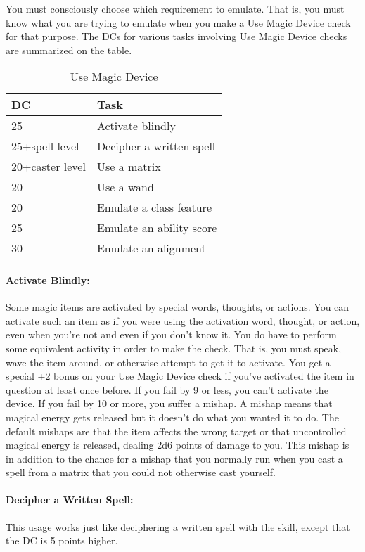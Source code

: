 You must consciously choose which requirement to emulate. That is, you must know what you are trying to emulate when you make a Use Magic Device check for that purpose. The DCs for various tasks involving Use Magic Device checks are summarized on the  table.
\begin{table*}
\centering
\caption{Use Magic Device}
\small
\label{tab:UseMagicDevice}
\begin{tabular}{ll}
\toprule
\textbf{DC}&\textbf{Task}\\
\midrule
25&Activate blindly\\
25+spell level&Decipher a written spell\\
20+caster level&Use a matrix\\
20&Use a wand\\
20&Emulate a class feature\\
25&Emulate an ability score\\
30&Emulate an alignment\\
\bottomrule
\end{tabular}
\normalsize
\end{table*}
\paragraph{Activate Blindly:}
Some magic items are activated by special words, thoughts, or actions. 
You can activate such an item as if you were using the activation word, thought, or action, even when you're not and even if you don't know it.
You do have to perform some equivalent activity in order to make the check. 
That is, you must speak, wave the item around, or otherwise attempt to get it to activate. 
You get a special +2 bonus on your Use Magic Device check if you've activated the item in question at least once before. 
If you fail by 9 or less, you can't activate the device. If you fail by 10 or more, you suffer a mishap. 
A mishap means that magical energy gets released but it doesn't do what you wanted it to do. 
The default mishaps are that the item affects the wrong target or that uncontrolled magical energy is released, dealing 2d6 points of damage to you. 
This mishap is in addition to the chance for a mishap that you normally run when you cast a spell from a matrix that you could not otherwise cast yourself.

\paragraph{Decipher a Written Spell:}
This usage works just like deciphering a written spell with the  skill, except that the DC is 5 points higher. 

